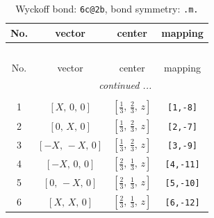 \documentclass[fleqn,8pt]{jsarticle}
\begin{document}
\renewcommand{\arraystretch}{1.2}
\begin{longtable}{cccc}
\caption{Wyckoff bond: {\tt 6c@2b}, bond symmetry: {\tt .m.}}
 \\
 \hline \hline
No. & vector & center & mapping \\ \hline \endfirsthead

\multicolumn{3}{l}{\tablename\ \thetable{}} \\
 \hline \hline
No. & vector & center & mapping \\ \hline \endhead

 \hline \hline
\multicolumn{3}{r}{\footnotesize\it continued ...} \\ \endfoot

 \hline \hline
\multicolumn{3}{r}{} \\ \endlastfoot

1 & $\left[ X,\, 0,\, 0 \right]$ & $\left[ \frac{1}{3},\, \frac{2}{3},\, z \right]$ & {\tt [1,-8]} \\ \hline
2 & $\left[ 0,\, X,\, 0 \right]$ & $\left[ \frac{1}{3},\, \frac{2}{3},\, z \right]$ & {\tt [2,-7]} \\ \hline
3 & $\left[ - X,\, - X,\, 0 \right]$ & $\left[ \frac{1}{3},\, \frac{2}{3},\, z \right]$ & {\tt [3,-9]} \\ \hline
4 & $\left[ - X,\, 0,\, 0 \right]$ & $\left[ \frac{2}{3},\, \frac{1}{3},\, z \right]$ & {\tt [4,-11]} \\ \hline
5 & $\left[ 0,\, - X,\, 0 \right]$ & $\left[ \frac{2}{3},\, \frac{1}{3},\, z \right]$ & {\tt [5,-10]} \\ \hline
6 & $\left[ X,\, X,\, 0 \right]$ & $\left[ \frac{2}{3},\, \frac{1}{3},\, z \right]$ & {\tt [6,-12]} \\
\end{longtable}
\renewcommand{\arraystretch}{1.2}
\end{document}
